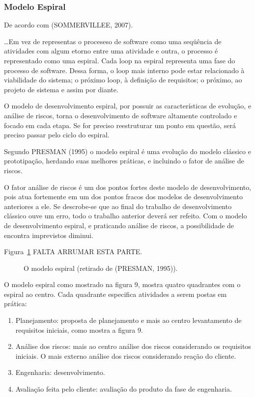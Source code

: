 \subsubsection{Modelo Espiral}

De acordo com  (SOMMERVILLEE, 2007).

\begin{citacao}
\ldots Em vez de representas o proceseso de software como uma seqüência de atividades com algum etorno entre uma atividade e outra, o processo é representado como uma espiral. Cada loop na espiral representa uma fase do processo de software. Dessa forma, o loop mais interno pode estar relacionado à viabilidade do sistema; o próximo loop, à definição de requisitos; o próximo, ao projeto de sistema e assim por diante.
\end{citacao}

O modelo de desenvolvimento espiral, por possuir as características de evolução, e análise de riscos, torna o desenvolvimento de software altamente controlado e focado em cada etapa. Se for preciso reestruturar um ponto em questão, será preciso passar pelo ciclo do espiral.

Segundo PRESMAN (1995) o modelo espiral é uma evolução do modelo clássico e prototipação, herdando suas melhores práticas, e incluindo o fator de análise de riscos.

O fator análise de riscos é um dos pontos fortes deste modelo de desenvolvimento, pois  atua fortemente em um dos pontos fracos dos modelos de desenvolvimento anteriores a ele. Se descrobe-se que ao final do trabalho de desenvolvimento clássico ouve um erro, todo o trabalho anterior deverá ser refeito. Com o modelo de desenvolvimento espiral, e praticando análise de riscos, a possibilidade de encontra imprevistos diminui.

Figura~\ref{f1.9} FALTA ARRUMAR ESTA PARTE.
\begin{figure}[!hbp]
\makebox[\textwidth]{\framebox[5cm]{\rule{0pt}{5cm}}}
\caption{O modelo espiral (retirado de (PRESMAN, 1995)).} \label{f1.9}
\end{figure}

O modelo espiral como mostrado na figura 9, mostra quatro quadrantes com o espiral ao centro. Cada quadrante especifica atividades a serem postas em prática:

\begin{enumerate}
	\item Planejamento: proposta de planejamento e mais ao centro levantamento de requisitos iniciais, como mostra a figura 9.
	\item Análise dos riscos: mais ao centro análise dos riscos considerando os requisitos iniciais. O mais externo análise dos riscos considerando reação do cliente.
	\item Engenharia: desenvolvimento.
	\item Avaliação feita pelo cliente: avaliação do produto da fase de engenharia.
\end{enumerate}

